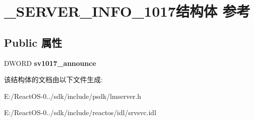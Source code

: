 \hypertarget{struct___s_e_r_v_e_r___i_n_f_o__1017}{}\section{\+\_\+\+S\+E\+R\+V\+E\+R\+\_\+\+I\+N\+F\+O\+\_\+1017结构体 参考}
\label{struct___s_e_r_v_e_r___i_n_f_o__1017}
\subsection*{Public 属性}
\begin{DoxyCompactItemize}
\item 
\mbox{\label{struct___s_e_r_v_e_r___i_n_f_o__1017_a64c2daabf5b4af3fd01d53dbb3b4e4fd}} 
D\+W\+O\+RD {\bfseries sv1017\+\_\+announce}
\end{DoxyCompactItemize}


该结构体的文档由以下文件生成\+:\begin{DoxyCompactItemize}
\item 
E\+:/\+React\+O\+S-\/0../sdk/include/psdk/lmserver.\+h\item 
E\+:/\+React\+O\+S-\/0../sdk/include/reactos/idl/srvsvc.\+idl\end{DoxyCompactItemize}
